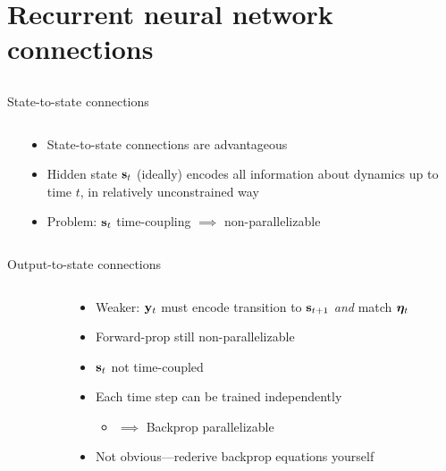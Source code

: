 \section{Recurrent neural network connections}
\subsection{}

\begin{frame}{State-to-state connections}
    \begin{columns}
        \begin{column}{0.602\textwidth}
            
        \end{column}
        \begin{column}{0.398\textwidth}
            \begin{itemize}
                \item State-to-state connections are advantageous
                \item Hidden state $\mathbf{s}_t$ (ideally) encodes all information about dynamics up to time $t$, in relatively unconstrained way
                \item Problem: $\mathbf{s}_t$ time-coupling $\implies$ non-parallelizable
            \end{itemize}
        \end{column}
    \end{columns}
\end{frame}

\begin{frame}{Output-to-state connections}
    \begin{columns}
        \begin{column}{0.47\textwidth}
            
        \end{column}
        \begin{column}{0.53\textwidth}
            \begin{itemize}
                \item Weaker: $\mathbf{y}_t$ must encode transition to $\mathbf{s}_{t+1}$ \emph{and} match $\bm{\eta}_t$
                \item Forward-prop still non-parallelizable
                \item $\mathbf{s}_t$ not time-coupled
                \item Each time step can be trained independently
                \begin{itemize}
                    \item $\implies$ Backprop parallelizable
                \end{itemize}
                \item Not obvious---rederive backprop equations yourself \smiley
            \end{itemize}
        \end{column}
    \end{columns}
\end{frame}

